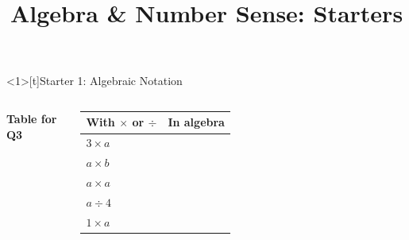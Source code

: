 \documentclass{beamer}
\title{Algebra \& Number Sense: Starters}
\author{}
\date{}
\newcommand{\ablank}[1]{%
  \alt<2>{\textcolor{red}{#1}}{\underline{\phantom{#1}}}%
}
\newcommand{\dheading}[1]{{\scriptsize\bfseries #1}\par\vspace{0.2em}}
\newcommand{\tblank}[1]{\ablank{\makebox[1.6em]{#1}}}
\newcommand{\tgiven}[1]{\makebox[1.6em]{#1}}
\begin{document}

\begin{frame}<1>[t]{Starter 1: Algebraic Notation}
\begin{columns}[T,onlytextwidth]

\vspace{-0.4em}
\dheading{Table for Q3}
{\footnotesize
\renewcommand{\arraystretch}{1.25}
\begin{tabular}{@{}l|l@{}}
  With $\times$ or $\div$ & In algebra\\ \hline
  $3\times a$ & \tgiven{$3a$}\\
  $a\times b$ & \tblank{$ab$}\\
  $a\times a$ & \tblank{$a^2$}\\
  $a\div4$    & \tblank{$\dfrac{a}{4}$}\\[2pt]
  $1\times a$ & \tblank{$a$}
\end{tabular}}


\end{columns}
\end{frame}
\end{document}
